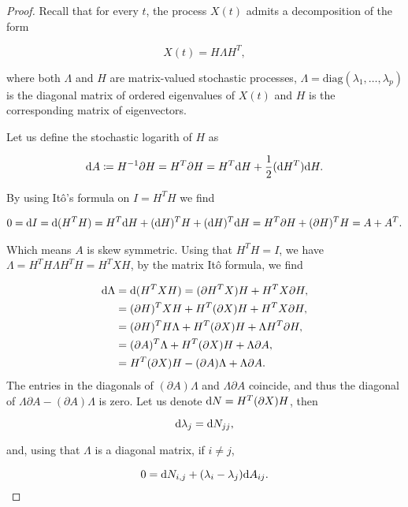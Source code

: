 \begin{proof}
    Recall that for every $t$, the process $X(t)$ admits a decomposition of the form 

    \[ X(t) = H \Lambda H^T, \]

    \noindent where both $\Lambda$ and $H$ are matrix-valued stochastic processes, $\Lambda = \mathrm{diag}(\lambda_1, \dots, \lambda_p)$ is the diagonal matrix of ordered eigenvalues of $X(t)$ and $H$ is the corresponding matrix of eigenvectors.

    Let us define the stochastic logarith of $H$ as

    \begin{equation*}
        \mathrm d A \coloneqq H^{-1} \partial H = H^T \partial H = H^T \mathrm d H + \frac12(\mathrm d H^T)\mathrm d H.
    \end{equation*}

    By using Itô's formula on $I = H^T H$ we find

    \begin{align*}
        0 = \mathrm d I = \mathrm d(H^T H) = H^T\mathrm d H + (\mathrm d H)^T H + (\mathrm d H)^T \mathrm d H = H^T\partial H + (\partial H)^T H = A + A^T.
    \end{align*}

    Which means $A$ is skew symmetric. Using that $H^T H = I$, we have $\Lambda = H^T H \Lambda H^T H = H^T X H$, by the matrix Itô formula, we find 


    \begin{align*} 
        \mathrm d \Lambda & = \mathrm d(H^TXH) = (\partial H^TX)H + H^TX\partial H,\\ 
        & = (\partial H)^T XH + H^T(\partial X)H + H^T X \partial H,\\
        & = (\partial H)^T H\Lambda + H^T(\partial X) H + \Lambda H^T \partial H,\\
        & = (\partial A)^T \Lambda + H^T(\partial X) H + \Lambda \partial A,\\
        & = H^T(\partial X) H -  (\partial A)\Lambda + \Lambda \partial A.
    \end{align*}
    The entries in the diagonals of $(\partial A)\Lambda$ and $\Lambda\partial A$ coincide, and thus the diagonal of $\Lambda\partial A-(\partial A)\Lambda$ is zero. Let us denote $\mathrm d N = H^T(\partial X) H$, then

    \[ \mathrm d \lambda_j = \mathrm d N_{jj}, \]

    \noindent and, using that $\Lambda$ is a diagonal matrix, if $i\neq j$,

    \[ 0 = \mathrm d N_{i,j} + (\lambda_i - \lambda_j)\mathrm d A_{ij}. \]


\end{proof}
